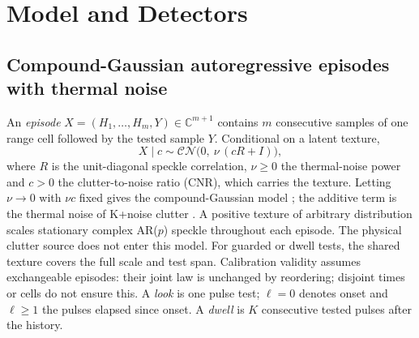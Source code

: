 \documentclass[journal]{IEEEtran}
\begin{document}
\section{Model and Detectors}\label{sec:model}
\subsection{Compound-Gaussian autoregressive episodes with thermal noise}
An \emph{episode} $X=(H_1,\dots,H_m,Y)\in\mathbb{C}^{m+1}$ contains $m$ consecutive samples of one range cell followed by the tested sample $Y$. Conditional on a latent texture,
\begin{equation}
X\mid c\sim\mathcal{CN}\big(0,\ \nu\,(cR+I)\big),
\label{eq:r7model}
\end{equation}
where $R$ is the unit-diagonal speckle correlation, $\nu\ge0$ the thermal-noise power and $c>0$ the clutter-to-noise ratio (CNR), which carries the texture. Letting $\nu\to0$ with $\nu c$ fixed gives the compound-Gaussian model \cite{conte1995,ollila2012}; the additive term is the thermal noise of K+noise clutter \cite{watts1987,ward2013}. A positive texture of arbitrary distribution scales stationary complex AR($p$) speckle throughout each episode. The physical clutter source does not enter this model. For guarded or dwell tests, the shared texture covers the full scale and test span. Calibration validity assumes exchangeable episodes: their joint law is unchanged by reordering; disjoint times or cells do not ensure this. A \emph{look} is one pulse test; $\ell=0$ denotes onset and $\ell\ge1$ the pulses elapsed since onset. A \emph{dwell} is $K$ consecutive tested pulses after the history.
\end{document}
